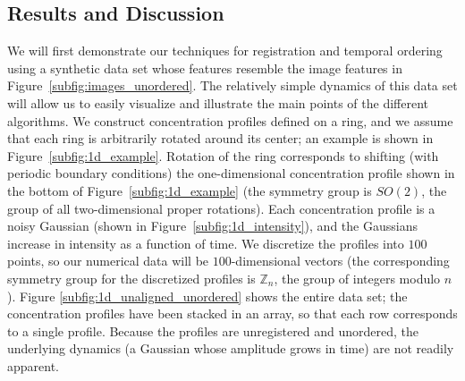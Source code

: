 \documentclass{pnastwo}
\begin{document}
\begin{article}
\section{Results and Discussion}

%
%
%
%


We will first demonstrate our techniques for registration and temporal ordering using a synthetic data set whose features resemble the image features in Figure~\ref{subfig:images_unordered}.
%
The relatively simple dynamics of this data set will allow us to easily visualize and illustrate the main points of the different algorithms.
%
We construct concentration profiles defined on a ring, and we assume that each ring is arbitrarily rotated around its center; an example is shown in Figure~\ref{subfig:1d_example}.
%
Rotation of the ring corresponds to shifting (with periodic boundary conditions) the one-dimensional concentration profile shown in the bottom of Figure~\ref{subfig:1d_example} (the symmetry group is $SO(2)$, the group of all two-dimensional proper rotations).
%
Each concentration profile is a noisy Gaussian (shown in Figure~\ref{subfig:1d_intensity}), and the Gaussians increase in intensity as  a function of time.
%
We discretize the profiles into $100$ points, so our numerical data will be $100$-dimensional vectors (the corresponding symmetry group for the discretized profiles is $\mathbb{Z}_n$, the group of integers modulo $n$).
%
Figure \ref{subfig:1d_unaligned_unordered} shows the entire data set; the concentration profiles have been stacked in an array, so that each row corresponds to a single profile.
%
Because the profiles are unregistered and unordered, the underlying dynamics (a Gaussian whose amplitude grows in time) are not readily apparent.


\end{article}
\end{document}
